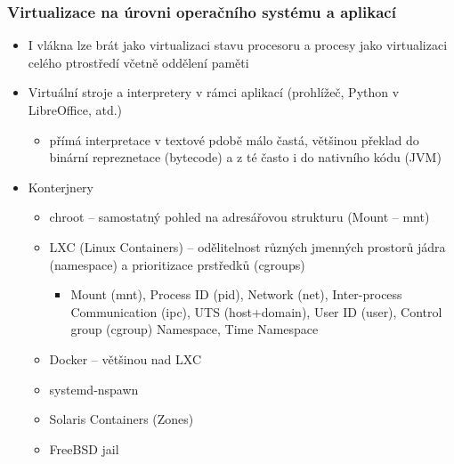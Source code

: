 \documentclass{beamer}
\begin{document}
\begin{frame}
\frametitle{Virtualizace na úrovni operačního systému a aplikací}

\begin{itemize}
 \item I vlákna lze brát jako virtualizaci stavu procesoru a procesy jako virtualizaci celého ptrostředí včetně oddělení paměti
 \item Virtuální stroje a interpretery v rámci aplikací (prohlížeč, Python v LibreOffice, atd.)
 \begin{itemize}
  \item přímá interpretace v textové pdobě málo častá, většinou překlad do binární repreznetace (bytecode) a z té často i do nativního kódu (JVM)
 \end{itemize}
 \item Konterjnery
 \begin{itemize}
  \item chroot -- samostatný pohled na adresářovou strukturu (Mount -- mnt)
  \item LXC (Linux Containers) -- odělitelnost různých jmenných prostorů jádra (namespace) a prioritizace prstředků (cgroups)
  \begin{itemize}
   \item Mount (mnt), Process ID (pid), Network (net), Inter-process Communication (ipc), UTS (host+domain), User ID (user), Control group (cgroup) Namespace, Time Namespace
  \end{itemize}
  \item Docker -- většinou nad LXC
  \item systemd-nspawn
  \item Solaris Containers (Zones)
  \item FreeBSD jail
 \end{itemize}
\end{itemize}
\end{frame}
\end{document}
